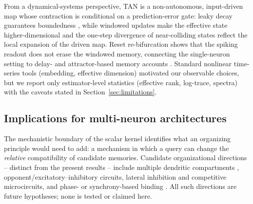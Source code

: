 From a dynamical-systems perspective, TAN is a non-autonomous,
input-driven map whose contraction is conditional on a prediction-error
gate: leaky decay guarantees boundedness \citep{lohmiller1998,
strogatz2014}, while windowed updates make the effective state
higher-dimensional and the one-step divergence of near-colliding states
reflect the local expansion of the driven map.  Reset re-bifurcation
shows that the spiking readout does not erase the windowed memory,
connecting the single-neuron setting to delay- and
attractor-based memory accounts \citep{compte2000,durstewitz2000,
elman1990}.  Standard nonlinear time-series tools (embedding, effective
dimension) \citep{takens1981,grassberger1983,kennel1992,facco2017,
bandt2002} motivated our observable choices, but we report only
estimator-level statistics (effective rank, log-trace, spectra) with the
caveats stated in Section~\ref{sec:limitations}.

\subsection{Implications for multi-neuron architectures}\label{sec:disc-org}

The mechanistic boundary of the scalar kernel identifies what an
organizing principle would need to add: a mechanism in which a query can
change the \emph{relative} compatibility of candidate memories.
Candidate organizational directions -- distinct from the present results
-- include multiple dendritic compartments \citep{london2005,larkum2013,
spruston2008}, opponent/excitatory--inhibitory circuits, lateral
inhibition and competitive microcircuits, and phase- or synchrony-based
binding \citep{von_der_malsburg1995,singer1995,fries2005}.  All such
directions are future hypotheses; none is tested or claimed here.

